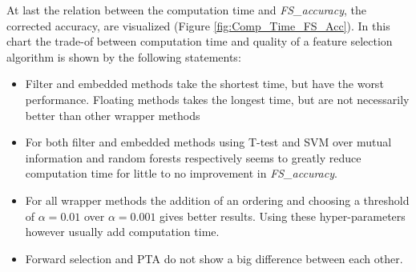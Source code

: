 \documentclass[10pt,a4paper]{report}
\begin{document}
	At last the relation between the computation time and \textit{FS\_accuracy}, the corrected accuracy, are visualized (Figure \ref{fig:Comp_Time_FS_Acc}). In this chart the trade-of between computation time and quality of a feature selection algorithm is  shown by the following statements: 
	\begin{itemize}
		\item Filter and embedded methods take the shortest time, but have the worst performance. Floating methods takes the longest time, but are not necessarily better than other wrapper methods
		\item For both filter and embedded methods using T-test and SVM over mutual information and random forests respectively seems to greatly reduce computation time for little to no improvement in \textit{FS\_accuracy}.
		\item For all wrapper methods the addition of an ordering and choosing a threshold of $\alpha = 0.01$ over $\alpha = 0.001$ gives better results. Using these hyper-parameters however usually add computation time.
		\item Forward selection and PTA do not show a big difference between each other.
	\end{itemize}
	
\end{document}
